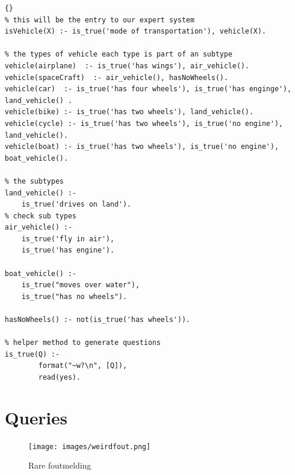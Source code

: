 \begin{lstlisting}{}
% this will be the entry to our expert system
isVehicle(X) :- is_true('mode of transportation'), vehicle(X).

% the types of vehicle each type is part of an subtype
vehicle(airplane)  :- is_true('has wings'), air_vehicle().
vehicle(spaceCraft)  :- air_vehicle(), hasNoWheels().
vehicle(car)  :- is_true('has four wheels'), is_true('has enginge'), land_vehicle() .
vehicle(bike) :- is_true('has two wheels'), land_vehicle().
vehicle(cycle) :- is_true('has two wheels'), is_true('no engine'), land_vehicle().
vehicle(boat) :- is_true('has two wheels'), is_true('no engine'), boat_vehicle().

% the subtypes
land_vehicle() :-
	is_true('drives on land').
% check sub types
air_vehicle() :-
	is_true('fly in air'),
	is_true('has engine').

boat_vehicle() :-
	is_true("moves over water"),
    is_true("has no wheels").

hasNoWheels() :- not(is_true('has wheels')).

% helper method to generate questions
is_true(Q) :-
        format("~w?\n", [Q]),
        read(yes).
\end{lstlisting}

\newpage
\section{Queries} \label{man-queries}

\begin{figure}[!h]
    \centering
    \texttt{[image: images/weirdfout.png]}
    \caption{Rare foutmelding}
    \label{fig:rareFout}
\end{figure}{}
